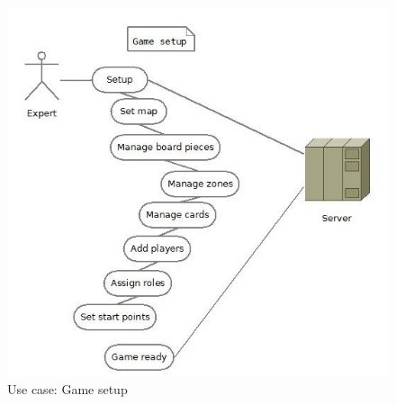 \begin{figure}[H]
  \centering
    \includegraphics[width=1.0\textwidth]{img/gamesetup.jpg}
  \caption{Use case: Game setup} 
  \label{fig:gamesetup}
\end{figure}


